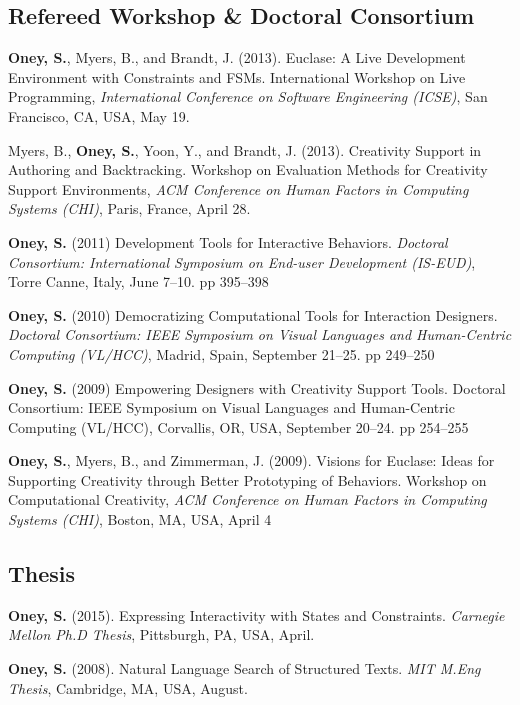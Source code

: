 \subsection{Refereed Workshop \& Doctoral Consortium}

 {
\textbf{Oney, S.}, Myers, B., and Brandt, J. (2013). Euclase: A Live Development Environment with Constraints and FSMs. International Workshop on Live Programming, \textit{International Conference on Software Engineering (ICSE)}, San Francisco, CA, USA, May 19.
}

 {
Myers, B., \textbf{Oney, S.}, Yoon, Y., and Brandt, J. (2013). Creativity Support in Authoring and Backtracking. Workshop on Evaluation Methods for Creativity Support Environments, \textit{ACM Conference on Human Factors in Computing Systems (CHI)}, Paris, France, April 28.
}

 {
\textbf{Oney, S.} (2011) Development Tools for Interactive Behaviors. \textit{Doctoral Consortium: International Symposium on End-user Development (IS-EUD)}, Torre Canne, Italy, June 7--10. pp 395--398
}

 {
\textbf{Oney, S.} (2010) Democratizing Computational Tools for Interaction Designers. \textit{Doctoral Consortium: IEEE Symposium on Visual Languages and Human-Centric Computing (VL/HCC)}, Madrid, Spain, September 21--25. pp 249--250
}

 {
\textbf{Oney, S.} (2009) Empowering Designers with Creativity Support Tools. Doctoral Consortium: IEEE Symposium on Visual Languages and Human-Centric Computing (VL/HCC), Corvallis, OR, USA, September 20--24. pp 254--255
}

 {
\textbf{Oney, S.}, Myers, B., and Zimmerman, J. (2009). Visions for Euclase: Ideas for Supporting Creativity through Better Prototyping of Behaviors. Workshop on Computational Creativity, \textit{ACM Conference on Human Factors in Computing Systems (CHI)}, Boston, MA, USA, April 4
}

\subsection{Thesis}

 {
\textbf{Oney, S.} (2015). Expressing Interactivity with States and Constraints. \textit{Carnegie Mellon Ph.D Thesis}, Pittsburgh, PA, USA, April.
}

 {
\textbf{Oney, S.} (2008). Natural Language Search of Structured Texts. \textit{MIT M.Eng Thesis}, Cambridge, MA, USA, August.
}